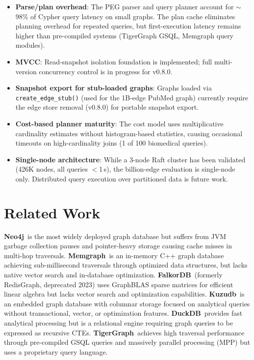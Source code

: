 \documentclass[11pt]{article}
\begin{document}
\begin{itemize}[leftmargin=*]
  \item \textbf{Parse/plan overhead}: The PEG parser and query planner account for ${\sim}$98\% of Cypher query latency on small graphs. The plan cache eliminates planning overhead for repeated queries, but first-execution latency remains higher than pre-compiled systems (TigerGraph GSQL, Memgraph query modules).
  \item \textbf{MVCC}: Read-snapshot isolation foundation is implemented; full multi-version concurrency control is in progress for v0.8.0.
  \item \textbf{Snapshot export for stub-loaded graphs}: Graphs loaded via \texttt{create\_edge\_stub()} (used for the 1B-edge PubMed graph) currently require the edge store removal (v0.8.0) for portable snapshot export.
  \item \textbf{Cost-based planner maturity}: The cost model uses multiplicative cardinality estimates without histogram-based statistics, causing occasional timeouts on high-cardinality joins (1 of 100 biomedical queries).
  \item \textbf{Single-node architecture}: While a 3-node Raft cluster has been validated (426K nodes, all queries $<$1\,s), the billion-edge evaluation is single-node only. Distributed query execution over partitioned data is future work.
\end{itemize}

\section{Related Work}

\textbf{Neo4j}~is the most widely deployed graph database but suffers from JVM garbage collection pauses and pointer-heavy storage causing cache misses in multi-hop traversals. \textbf{Memgraph}~is an in-memory C++ graph database achieving sub-millisecond traversals through optimized data structures, but lacks native vector search and in-database optimization. \textbf{FalkorDB}~(formerly RedisGraph, deprecated 2023) uses GraphBLAS sparse matrices for efficient linear algebra but lacks vector search and optimization capabilities. \textbf{Kuzudb}~is an embedded graph database with columnar storage focused on analytical queries without transactional, vector, or optimization features. \textbf{DuckDB}~provides fast analytical processing but is a relational engine requiring graph queries to be expressed as recursive CTEs. \textbf{TigerGraph}~achieves high traversal performance through pre-compiled GSQL queries and massively parallel processing (MPP) but uses a proprietary query language.
\end{document}
